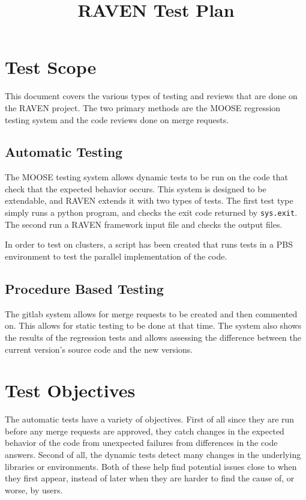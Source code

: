 \documentclass{article}
\title{RAVEN Test Plan}
\begin{document}
\maketitle

\section{Test Scope}

This document covers the various types of testing and reviews that are
done on the RAVEN project. The two primary methods are the MOOSE
regression testing system and the code reviews done on merge requests.

\subsection{Automatic Testing}

The MOOSE testing system allows dynamic tests to be run on the code
that check that the expected behavior occurs.  This system is designed
to be extendable, and RAVEN extends it with two types of tests.  The
first test type simply runs a python program, and checks the exit code
returned by \verb'sys.exit'.  The second run a RAVEN framework input
file and checks the output files.

In order to test on clusters, a script has been created that runs
tests in a PBS environment to test the parallel implementation of the
code.

\subsection{Procedure Based Testing}

The gitlab system allows for merge requests to be created and then
commented on.  This allows for static testing to be done at that time.
The system also shows the results of the regression tests and allows
assessing the difference between the current version's source code and
the new versions.

\section{Test Objectives}

The automatic tests have a variety of objectives.  First of all since
they are run before any merge requests are approved, they catch
changes in the expected behavior of the code from unexpected failures
from differences in the code answers.  Second of all, the dynamic
tests detect many changes in the underlying libraries or environments.
Both of these help find potential issues close to when they first
appear, instead of later when they are harder to find the cause of, or
worse, by users.
\end{document}
